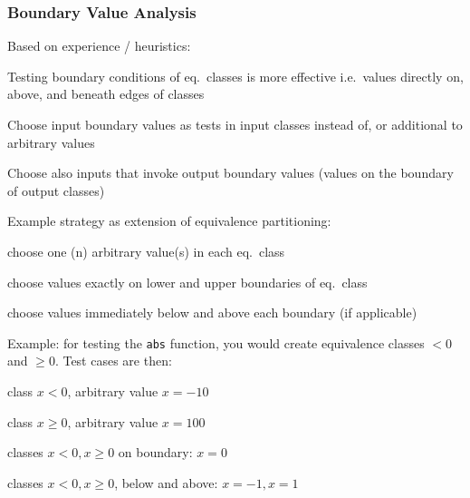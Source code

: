 
\subsubsection{Boundary Value Analysis}

Based on experience / heuristics:
\begin{itemize*}
\item Testing boundary conditions of eq.\ classes is more effective i.e.\ values directly on, above, and beneath edges of classes
\item Choose input boundary values as tests in input classes instead of, or additional to arbitrary values
\item Choose also inputs that invoke output boundary values (values on the boundary of output classes)
\item Example strategy as extension of equivalence partitioning:
\begin{itemize*}
	\item choose one (n) arbitrary value(s) in each eq.\ class %
	\item choose values exactly on lower and upper boundaries of eq.\ class
	\item choose values immediately below and above each boundary (if applicable)
\end{itemize*}
\end{itemize*}

Example: for testing the \verb|abs| function, you would create equivalence classes $<0$ and $\geq 0$. Test cases are then:
\begin{itemize*}
    \item class $x<0$, arbitrary value $x = -10$
    \item class $x \geq 0$, arbitrary value $x = 100$
    \item classes $x<0, x\geq 0$ on boundary: $x=0$
    \item classes $x<0, x \geq 0$, below and above: $x=-1, x=1$
\end{itemize*}

